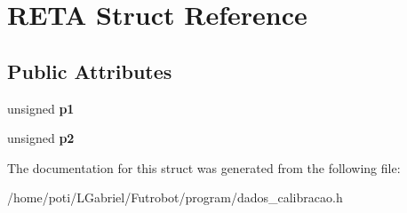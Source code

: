 \hypertarget{structRETA}{}\section{R\+E\+TA Struct Reference}
\label{structRETA}
\subsection*{Public Attributes}
\begin{DoxyCompactItemize}
\item 
unsigned {\bfseries p1}\hypertarget{structRETA_ada6696c26243040788e3b32495583a38}{}\label{structRETA_ada6696c26243040788e3b32495583a38}

\item 
unsigned {\bfseries p2}\hypertarget{structRETA_a886934cd3b923e681b9c2d1084ca6eda}{}\label{structRETA_a886934cd3b923e681b9c2d1084ca6eda}

\end{DoxyCompactItemize}


The documentation for this struct was generated from the following file\+:\begin{DoxyCompactItemize}
\item 
/home/poti/\+L\+Gabriel/\+Futrobot/program/dados\+\_\+calibracao.\+h\end{DoxyCompactItemize}
